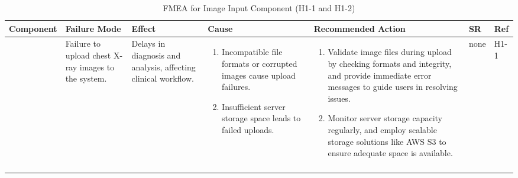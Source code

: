 \documentclass{article}
\begin{document}
\begin{landscape}
    \begin{table}[ht]
    \centering
    \caption{FMEA for Image Input Component (H1-1 and H1-2)}
    \renewcommand{\arraystretch}{1.1}
    {
    \setlength{\tabcolsep}{2pt}
    \begin{tabular}{|p{2.5cm}|p{2.5cm}|p{3cm}|p{5cm}|p{6cm}|p{1cm}|p{1cm}|}
    \hline
    \textbf{Component} & \textbf{Failure Mode} & \textbf{Effect} & \textbf{Cause} & \textbf{Recommended Action} & \textbf{SR} & \textbf{Ref} \\
    \hline

    \multirow{2}{*}{} 
     & Failure to upload chest X-ray images to the system.
     & Delays in diagnosis and analysis, affecting clinical workflow.
     &
     \begin{enumerate}[leftmargin=*, label={\alph*.}, itemsep=1pt]
         \item Incompatible file formats or corrupted images cause upload failures.
         \item Insufficient server storage space leads to failed uploads.
     \end{enumerate}
     &
     \begin{enumerate}[leftmargin=*, label={\alph*.}, itemsep=1pt]
         \item Validate image files during upload by checking formats and integrity, and provide immediate error messages to guide users in resolving issues.
         \item Monitor server storage capacity regularly, and employ scalable storage solutions like AWS S3 to ensure adequate space is available.
     \end{enumerate}
     & none & H1-1 \\ \cline{2-7}


\end{tabular}}
\end{table}
\end{landscape}
\end{document}
